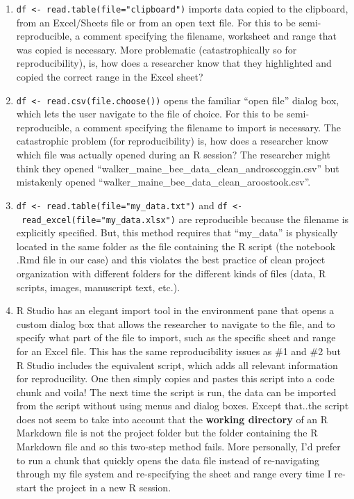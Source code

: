 \documentclass[]{book}
\providecommand{\tightlist}{%
  \setlength{\itemsep}{0pt}\setlength{\parskip}{0pt}}
\begin{document}
\begin{enumerate}
\def\labelenumi{\arabic{enumi}.}
\tightlist
\item
  \texttt{df\ \textless{}-\ read.table(file="clipboard")} imports data copied to the clipboard, from an Excel/Sheets file or from an open text file. For this to be semi-reproducible, a comment specifying the filename, worksheet and range that was copied is necessary. More problematic (catastrophically so for reproducibility), is, how does a researcher know that they highlighted and copied the correct range in the Excel sheet?
\item
  \texttt{df\ \textless{}-\ read.csv(file.choose())} opens the familiar ``open file'' dialog box, which lets the user navigate to the file of choice. For this to be semi-reproducible, a comment specifying the filename to import is necessary. The catastrophic problem (for reproducibility) is, how does a researcher know which file was actually opened during an R session? The researcher might think they opened ``walker\_maine\_bee\_data\_clean\_androscoggin.csv'' but mistakenly opened ``walker\_maine\_bee\_data\_clean\_aroostook.csv''.
\item
  \texttt{df\ \textless{}-\ read.table(file="my\_data.txt")} and \texttt{df\ \textless{}-\ read\_excel(file="my\_data.xlsx")} are reproducible because the filename is explicitly specified. But, this method requires that ``my\_data'' is physically located in the same folder as the file containing the R script (the notebook .Rmd file in our case) and this violates the best practice of clean project organization with different folders for the different kinds of files (data, R scripts, images, manuscript text, etc.).
\item
  R Studio has an elegant import tool in the environment pane that opens a custom dialog box that allows the researcher to navigate to the file, and to specify what part of the file to import, such as the specific sheet and range for an Excel file. This has the same reproducibility issues as \#1 and \#2 but R Studio includes the equivalent script, which adds all relevant information for reproducility. One then simply copies and pastes this script into a code chunk and voila! The next time the script is run, the data can be imported from the script without using menus and dialog boxes. Except that..the script does not seem to take into account that the \textbf{working directory} of an R Markdown file is not the project folder but the folder containing the R Markdown file and so this two-step method fails. More personally, I'd prefer to run a chunk that quickly opens the data file instead of re-navigating through my file system and re-specifying the sheet and range every time I re-start the project in a new R session.
\end{enumerate}
\end{document}
